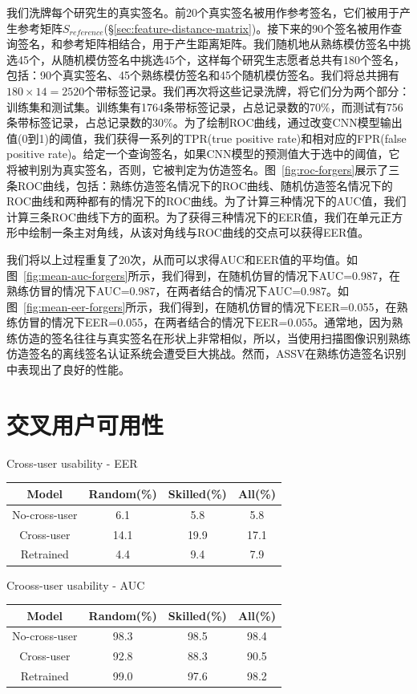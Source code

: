 我们洗牌每个研究生的真实签名。前20个真实签名被用作参考签名，它们被用于产生参考矩阵$S_{reference}$(\S\ref{sec:feature-distance-matrix})。接下来的90个签名被用作查询签名，和参考矩阵相结合，用于产生距离矩阵。我们随机地从熟练模仿签名中挑选45个，从随机模仿签名中挑选45个，这样每个研究生志愿者总共有180个签名，包括：90个真实签名、45个熟练模仿签名和45个随机模仿签名。我们将总共拥有$180\times 14=2520$个带标签记录。我们再次将这些记录洗牌，将它们分为两个部分：训练集和测试集。训练集有1764条带标签记录，占总记录数的70\%，而测试有756条带标签记录，占总记录数的30\%。为了绘制ROC曲线，通过改变CNN模型输出值(0到1)的阈值，我们获得一系列的TPR(true positive rate)和相对应的FPR(false positive rate)。给定一个查询签名，如果CNN模型的预测值大于选中的阈值，它将被判别为真实签名，否则，它被判定为仿造签名。图~\ref{fig:roc-forgers}展示了三条ROC曲线，包括：熟练仿造签名情况下的ROC曲线、随机仿造签名情况下的ROC曲线和两种都有的情况下的ROC曲线。为了计算三种情况下的AUC值，我们计算三条ROC曲线下方的面积。为了获得三种情况下的EER值，我们在单元正方形中绘制一条主对角线，从该对角线与ROC曲线的交点可以获得EER值。

我们将以上过程重复了20次，从而可以求得AUC和EER值的平均值。如图~\ref{fig:mean-auc-forgers}所示，我们得到，在随机仿冒的情况下AUC=0.987，在熟练仿冒的情况下AUC=0.987，在两者结合的情况下AUC=0.987。如图~\ref{fig:mean-eer-forgers}所示，我们得到，在随机仿冒的情况下EER=0.055，在熟练仿冒的情况下EER=0.055，在两者结合的情况下EER=0.055。通常地，因为熟练仿造的签名往往与真实签名在形状上非常相似，所以，当使用扫描图像识别熟练仿造签名的离线签名认证系统会遭受巨大挑战。然而，ASSV在熟练仿造签名识别中表现出了良好的性能。

\section{交叉用户可用性}

\begin{table}[ht]
  \centering
    {Cross-user usability - EER}
    \label{table:cross-eer}
    \begin{tabular}{c c c c}
      \hline\hline 
      Model & Random(\%) & Skilled(\%) & All(\%) \\ 
      \hline 
      No-cross-user & 6.1 & 5.8 & 5.8 \\
      Cross-user & 14.1 & 19.9 & 17.1 \\
      Retrained & 4.4 & 9.4 & 7.9 \\
      \hline 
    \end{tabular}
\end{table}
\begin{table}[ht]
  \centering
  {Crooss-user usability - AUC} 
  \label{table:cross-auc} 
  \begin{tabular}{c c c c} 
    \hline\hline 
    Model & Random(\%) & Skilled(\%) & All(\%) \\ 
    \hline 
    No-cross-user & 98.3 & 98.5 & 98.4 \\
    Cross-user & 92.8 & 88.3 & 90.5 \\
    Retrained & 99.0 & 97.6 & 98.2 \\
    \hline 
  \end{tabular}
\end{table}

